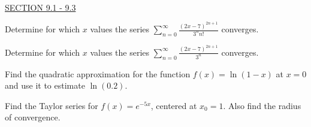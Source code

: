 \documentclass{exam}
\begin{document}
\begin{questions}
\ \\
\underline{SECTION 9.1 - 9.3}

\question Determine for which $x$ values the series $\displaystyle\sum_{n=0}^\infty \frac{(2x-7)^{2n+1}}{3^n n!}$ converges. 

\question Determine for which $x$ values the series $\displaystyle\sum_{n=0}^\infty \frac{(2x-7)^{2n+1}}{3^n }$ converges.  

\question Find the quadratic approximation for the function $f(x) = \ln(1-x)$ at $x=0$ and use it to estimate $\ln(0.2)$.  


\question Find the Taylor series for $f(x) = e^{-5x}$, centered at $x_0 = 1$. Also find the radius of convergence.  









\end{questions}
\end{document}
